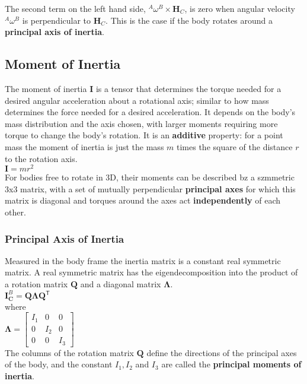 The second term on the left hand side, $^A\omega^B \times \mathbf{H}_C$, is zero when angular velocity $^A\omega^B$ is perpendicular to $\mathbf{H}_C$. This is the case if the body rotates around a \textbf{principal axis of inertia}.
 
\subsection{Moment of Inertia}
The moment of inertia $\mathbf{I}$ is a tensor that determines the torque needed for a desired angular acceleration about a rotational axis; similar to how mass determines the force needed for a desired acceleration. It depends on the body's mass distribution and the axis chosen, with larger moments requiring more torque to change the body's rotation. It is an \textbf{additive} property: for a point mass the moment of inertia is just the mass $m$ times the square of the distance $r$ to the rotation axis.
\\

$ \mathbf{I} = mr^2$
\\

For bodies free to rotate in 3D, their moments can be described bz a szmmetric 3x3 matrix, with a set of mutually perpendicular \textbf{principal axes} for which this matrix is diagonal and torques around the axes act \textbf{independently} of each other.

\subsubsection{Principal Axis of Inertia}
Measured in the body frame the inertia matrix is a constant real symmetric matrix. A real symmetric matrix has the eigendecomposition into the product of a rotation matrix $\mathbf{Q}$ and a diagonal matrix $\mathbf{\Lambda}$.
\\

$\mathbf {I} _{\mathbf {C} }^{B}=\mathbf {Q} \mathbf{\Lambda} \mathbf {Q} ^{\mathsf {T}}$
\\

where
\\

$\mathbf{\Lambda} = \begin{bmatrix} I_{1} & 0 & 0 \\ 0 & I_{2} & 0 \\ 0 & 0 & I_{3} \end{bmatrix}$
\\

The columns of the rotation matrix $\mathbf{Q}$ define the directions of the principal axes of the body, and the constant $I_{1}, I_{2}$ and $I_{3}$ are called the \textbf{principal moments of inertia}.
